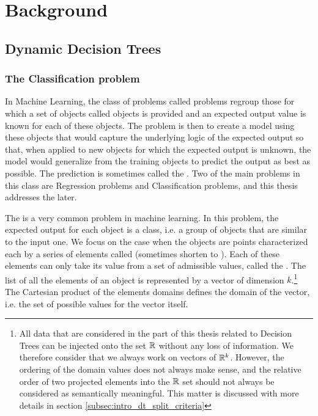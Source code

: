 \chapter{Background}
\section{Dynamic Decision Trees}
\subsection{The Classification problem} \label{subsec:intro_classification}
In Machine Learning, the class of problems called  problems regroup those for which a set of objects called  objects is provided and an expected output value is known for each of these objects. The problem is then to create a model using these objects that would capture the underlying logic of the expected output so that, when applied to new objects for which the expected output is unknown, the model would generalize from the training objects to predict the output as best as possible. The prediction is sometimes called the . Two of the main problems in this class are Regression problems and Classification problems, and this thesis addresses the later.

The  is a very common problem in machine learning. In this problem, the expected output for each object is a class, i.e. a group of objects that are similar to the input one. We focus on the case when the objects are points characterized each by a series of elements called  (sometimes shorten to ). Each of these elements can only take its value from a set of admissible values, called the . The list of all the elements of an object is represented by a vector of dimension $k$.\footnote{All data that are considered in the part of this thesis related to Decision Trees can be injected onto the set $\mathbb{R}$ without any loss of information. We therefore consider that we always work on vectors of $\mathbb{R}^k$. However, the ordering of the domain values does not always make sense, and the relative order of two projected elements into the $\mathbb{R}$ set should not always be considered as semantically meaningful. This matter is discussed with more details in section \ref{subsec:intro_dt_split_criteria}} The Cartesian product of the elements domains defines the domain of the vector, i.e. the set of possible values for the vector itself.

